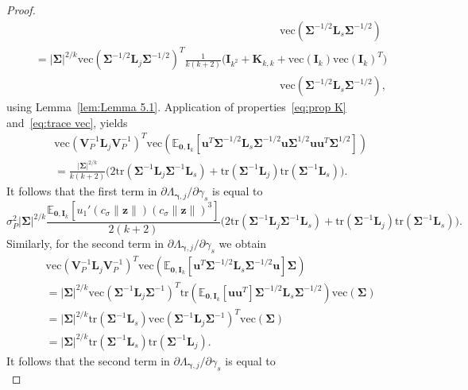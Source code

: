 \documentclass[10pt,a4paper]{amsart}
\newcommand{\E}{\mathbb{E}}
\newcommand{\bI}{\mathbf{I}}
\newcommand{\bK}{\mathbf{K}}
\newcommand{\bL}{\mathbf{L}}
\newcommand{\bSigma}{\mathbf{\Sigma}}
\newcommand{\bV}{\mathbf{V}}
\newcommand{\bgamma}{\bm\gamma}
\newcommand{\bu}{\mathbf{u}}
\newcommand{\bz}{\mathbf{z}}
\newcommand{\vc}{\mathrm{vec}}
\begin{document}
\begin{proof}
\[\begin{split}
&\qquad\qquad\qquad\qquad\qquad\qquad\qquad\qquad\qquad\qquad\qquad
\vc\left(\bSigma^{-1/2}\bL_s\bSigma^{-1/2}\right)
\\
&=
|\bSigma|^{2/k}
\vc(\bSigma^{-1/2}\bL_j\bSigma^{-1/2})^T
\frac{1}{k(k+2)}
\Big(
\bI_{k^2}+\bK_{k,k}
+
\vc(\bI_k)\vc(\bI_k)^T
\Big)\\
&\qquad\qquad\qquad\qquad\qquad\qquad\qquad\qquad\qquad\qquad\qquad
\vc\left(\bSigma^{-1/2}\bL_s\bSigma^{-1/2}\right),
\end{split}
\]
using Lemma~\ref{lem:Lemma 5.1}.
Application of properties~\eqref{eq:prop K} and~\eqref{eq:trace vec}, yields
\[
\begin{split}
&
\vc(\bV_P^{-1}\bL_j\bV_P^{-1})^T
\vc\left(
\E_{\mathbf{0},\bI_k}
\left[
\bu^T\bSigma^{-1/2}\bL_s\bSigma^{-1/2}\bu
\bSigma^{1/2}\bu\bu^T\bSigma^{1/2}
\right]
\right)\\
&=
\frac{|\bSigma|^{2/k}}{k(k+2)}
\Big(
2\text{tr}(\bSigma^{-1}\bL_j\bSigma^{-1}\bL_s)
+
\text{tr}(\bSigma^{-1}\bL_j)\text{tr}(\bSigma^{-1}\bL_s)
\Big).
\end{split}
\]
It follows that the first term in $\partial\Lambda_{\bgamma,j}/\partial\gamma_s$ is equal to
\begin{equation}
\label{eq:first term}
\sigma_P^2
|\bSigma|^{2/k}
\frac{\E_{\mathbf{0},\bI_k}
\left[
u_1'(c_\sigma\|\bz\|)(c_\sigma\|\bz\|)^3
\right]}{2(k+2)}
\Big(
2\text{tr}(\bSigma^{-1}\bL_j\bSigma^{-1}\bL_s)+\text{tr}(\bSigma^{-1}\bL_j)\text{tr}(\bSigma^{-1}\bL_s)
\Big).
\end{equation}
Similarly, for the second term in $\partial\Lambda_{\bgamma,j}/\partial\gamma_s$
we obtain
\[
\begin{split}
&
\vc\left(\bV_P^{-1}\bL_j\bV_P^{-1}\right)^T
\vc\left(\E_{\mathbf{0},\bI_k}
\left[
\bu^T\bSigma^{-1/2}\bL_s\bSigma^{-1/2}\bu
\right]
\bSigma
\right)\\
&=
|\bSigma|^{2/k}
\vc\left(\bSigma^{-1}\bL_j\bSigma^{-1}\right)^T
\text{tr}
\left(
\E_{\mathbf{0},\bI_k}
\left[
\bu\bu^T
\right]
\bSigma^{-1/2}\bL_s\bSigma^{-1/2}
\right)
\vc\left(\bSigma\right)
\\
&=
|\bSigma|^{2/k}
\text{tr}(\bSigma^{-1}\bL_s)
\vc\left(\bSigma^{-1}\bL_j\bSigma^{-1}\right)^T
\vc\left(\bSigma\right)\\
&=
|\bSigma|^{2/k}
\text{tr}(\bSigma^{-1}\bL_s)
\text{tr}(\bSigma^{-1}\bL_j).
\end{split}
\]
It follows that the second term in $\partial\Lambda_{\bgamma,j}/\partial\gamma_s$ is equal to
\begin{equation}
\label{eq:second term}

\end{equation}
\end{proof}
\end{document}
